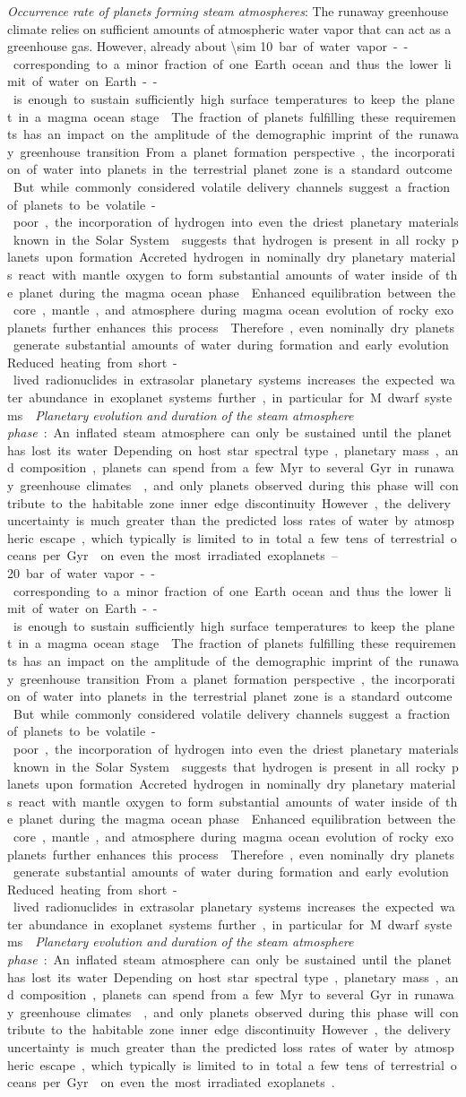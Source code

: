 \documentclass[twocolumn,twocolappendix]{aastex631}
\begin{document}
\textit{Occurrence rate of planets forming steam atmospheres}: The runaway greenhouse climate relies on sufficient amounts of atmospheric water vapor that can act as a greenhouse gas.
However, already about \SIrange{\sim 10}{20}~bar of water vapor -- corresponding to a minor fraction of one Earth ocean and thus the lower limit of water on Earth -- is enough to sustain sufficiently high surface temperatures to keep the planet in a magma ocean stage~\citep{Boukrouche2021,2021JGRE..12606711L}.
The fraction of planets fulfilling these requirements has an impact on the amplitude of the demographic imprint of the runaway greenhouse transition.
From a planet formation perspective, the incorporation of water into planets in the terrestrial planet zone is a standard outcome~\citep{2019PNAS..116.9723Z,Venturini2020}.
But while commonly considered volatile delivery channels suggest a fraction of planets to be volatile-poor, the incorporation of hydrogen into even the driest planetary materials known in the Solar System~\citep{2020Sci...369.1110P,2021PSJ.....2..244J} suggests that hydrogen is present in all rocky planets upon formation.
Accreted hydrogen in nominally dry planetary materials react with mantle oxygen to form substantial amounts of water inside of the planet during the magma ocean phase~\citep{Ikoma2018,2021ApJ...909L..22K,2020MNRAS.496.3755K,2022NatAs...6.1296K}.
Enhanced equilibration between the core, mantle, and atmosphere during magma ocean evolution of rocky exoplanets further enhances this process~\citep{2021ApJ...914L...4L,Schlichting2022}.
Therefore, even nominally dry planets generate substantial amounts of water during formation and early evolution.
Reduced heating from short-lived radionuclides in extrasolar planetary systems increases the expected water abundance in exoplanet systems further, in particular for M~dwarf systems~\citep{2022ApJ...938L...3L}.

\textit{Planetary evolution and duration of the steam atmosphere phase}: An inflated steam atmosphere can only be sustained until the planet has lost its water.
Depending on host star spectral type, planetary mass, and composition, planets can spend from a few Myr to several Gyr in runaway greenhouse climates~\citep[][]{Hamano2015,Luger2015}, and only planets observed during this phase will contribute to the habitable zone inner edge discontinuity.
However, the delivery uncertainty is much greater than the predicted loss rates of water by atmospheric escape, which typically is limited to in total a few tens of terrestrial oceans per Gyr~\citep{2018AJ....155..195W} on even the most irradiated exoplanets~\citep[see discussion in][]{2022ApJ...938L...3L}.
\end{document}
